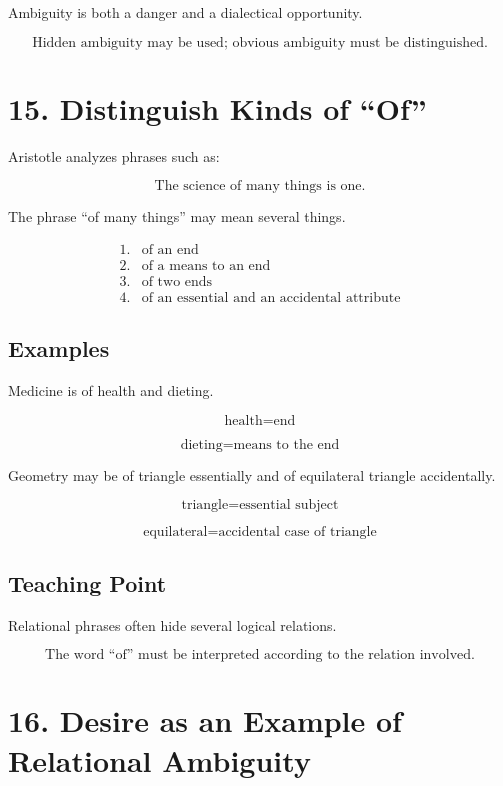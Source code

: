 \documentclass[12pt]{article}
\begin{document}
Ambiguity is both a danger and a dialectical opportunity.

\[
\boxed{
\text{Hidden ambiguity may be used; obvious ambiguity must be distinguished.}
}
\]

\section*{15. Distinguish Kinds of ``Of''}

Aristotle analyzes phrases such as:

\[
\text{The science of many things is one.}
\]

The phrase ``of many things'' may mean several things.

\[
\begin{array}{ll}
1. & \text{of an end} \\
2. & \text{of a means to an end} \\
3. & \text{of two ends} \\
4. & \text{of an essential and an accidental attribute}
\end{array}
\]

\subsection*{Examples}

Medicine is of health and dieting.

\[
\text{health} = \text{end}
\]

\[
\text{dieting} = \text{means to the end}
\]

Geometry may be of triangle essentially and of equilateral triangle
accidentally.

\[
\text{triangle} = \text{essential subject}
\]

\[
\text{equilateral} = \text{accidental case of triangle}
\]

\subsection*{Teaching Point}

Relational phrases often hide several logical relations.

\[
\boxed{
\text{The word ``of'' must be interpreted according to the relation involved.}
}
\]

\section*{16. Desire as an Example of Relational Ambiguity}
\end{document}
